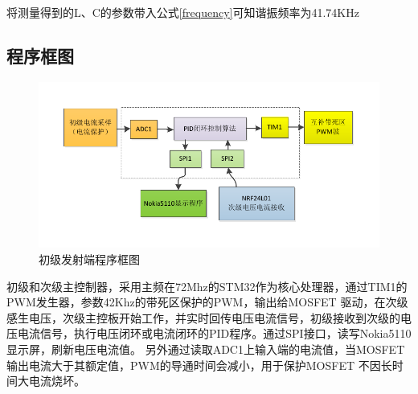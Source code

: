 ﻿\documentclass[UTF-8,12pt]{ctexart}
\begin{document}
            将测量得到的L、C的参数带入公式\ref{frequency}可知谐振频率为41.74KHz




    \subsection{程序框图}

            \begin{figure}[H]
              \centering
              \includegraphics[width=12cm]{pri.pdf}
              \caption{初级发射端程序框图}
              \label{frame_prim}
            \end{figure}
                初级和次级主控制器，采用主频在72Mhz的STM32作为核心处理器，通过TIM1的PWM发生器，参数42Khz的带死区保护的PWM，输出给MOSFET 驱动，在次级感生电压，次级主控板开始工作，并实时回传电压电流信号，初级接收到次级的电压电流信号，执行电压闭环或电流闭环的PID程序。通过SPI接口，读写Nokia5110显示屏，刷新电压电流值。
                另外通过读取ADC1上输入端的电流值，当MOSFET输出电流大于其额定值，PWM的导通时间会减小，用于保护MOSFET 不因长时间大电流烧坏。
\end{document}

